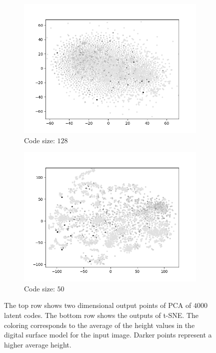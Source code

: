\begin{figure}[H]
\begin{subfigure}{.25\textwidth}
        \includegraphics[width=\textwidth]{images/figures/experiments_latent/pooling_dim1024_dsm.png}  
        \caption{Code size: $128$} 
    \end{subfigure}%
    \begin{subfigure}{.25\textwidth}
        \centering
        \includegraphics[width=\textwidth]{images/figures/experiments_latent/pooling_dim50_dsm.png}
        \caption{Code size: $50$}
    \end{subfigure}
    \caption{The top row shows two dimensional output points of PCA of $4000$ latent codes. 
    The bottom row shows the outputs
    of t-SNE. The coloring corresponds to the average of the height values in the digital surface model for the
    input image. Darker points represent a higher average height.}
\end{figure}


